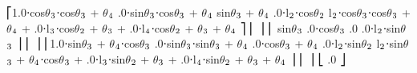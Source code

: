 \documentclass[letterpaper,10pt,english,openany,oneside]{sphinxmanual}
\begin{document}
\begin{sphinxVerbatim}[commandchars=\\\{\}]
⎡1.0⋅cos\(\theta\)\(\sb{\text{3}}\)⋅cos\(\theta\)\(\sb{\text{3}}\) + \(\theta\)\(\sb{\text{4}}\)  .0⋅sin\(\theta\)\(\sb{\text{3}}\)⋅cos\(\theta\)\(\sb{\text{3}}\) + \(\theta\)\(\sb{\text{4}}\)   \PYGZhy{}sin\(\theta\)\(\sb{\text{3}}\) + \(\theta\)\(\sb{\text{4}}\)    .0⋅l\(\sb{\text{2}}\)⋅cos\(\theta\)\(\sb{\text{2}}\) \PYGZhy{} l\(\sb{\text{2}}\)⋅cos\(\theta\)\(\sb{\text{3}}\)⋅cos\(\theta\)\(\sb{\text{3}}\) + \(\theta\)\(\sb{\text{4}}\) + .0⋅l\(\sb{\text{3}}\)⋅cos\(\theta\)\(\sb{\text{2}}\) + \(\theta\)\(\sb{\text{3}}\) + .0⋅l\(\sb{\text{4}}\)⋅cos\(\theta\)\(\sb{\text{2}}\) + \(\theta\)\(\sb{\text{3}}\) + \(\theta\)\(\sb{\text{4}}\)     ⎤
⎢                                                                                                                                                               ⎥
⎢        \PYGZhy{}sin\(\theta\)\(\sb{\text{3}}\)                .0⋅cos\(\theta\)\(\sb{\text{3}}\)               .0                                              .0⋅l\(\sb{\text{2}}\)⋅sin\(\theta\)\(\sb{\text{3}}\)                                       ⎥
⎢                                                                                                                                                               ⎥
⎢1.0⋅sin\(\theta\)\(\sb{\text{3}}\) + \(\theta\)\(\sb{\text{4}}\)⋅cos\(\theta\)\(\sb{\text{3}}\)  .0⋅sin\(\theta\)\(\sb{\text{3}}\)⋅sin\(\theta\)\(\sb{\text{3}}\) + \(\theta\)\(\sb{\text{4}}\)  .0⋅cos\(\theta\)\(\sb{\text{3}}\) + \(\theta\)\(\sb{\text{4}}\)  .0⋅l\(\sb{\text{2}}\)⋅sin\(\theta\)\(\sb{\text{2}}\) \PYGZhy{} l\(\sb{\text{2}}\)⋅sin\(\theta\)\(\sb{\text{3}}\) + \(\theta\)\(\sb{\text{4}}\)⋅cos\(\theta\)\(\sb{\text{3}}\) + .0⋅l\(\sb{\text{3}}\)⋅sin\(\theta\)\(\sb{\text{2}}\) + \(\theta\)\(\sb{\text{3}}\) + .0⋅l\(\sb{\text{4}}\)⋅sin\(\theta\)\(\sb{\text{2}}\) + \(\theta\)\(\sb{\text{3}}\) + \(\theta\)\(\sb{\text{4}}\)      ⎥
⎢                                                                                                                                                               ⎥
⎣                                                                                                              .0                                           ⎦
\end{sphinxVerbatim}
\end{document}
